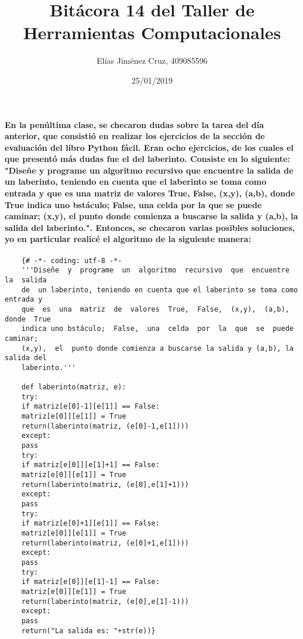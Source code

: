 \documentclass[letterpaper, 12pt, oneside]{article} %
\title{\Huge Bitácora 14 del Taller de Herramientas Computacionales}
\author{Elías Jiménez Cruz, 409085596}
\date{25/01/2019}
\begin{document}
	\maketitle
	\paragraph{En la penúltima clase, se checaron dudas sobre la tarea del día anterior, que consistió en realizar los ejercicios de la sección de evaluación del libro Python fácil. Eran ocho ejercicios, de los cuales el que presentó más dudas fue el del laberinto. Consiste en lo siguiente: "Diseñe  y  programe  un  algoritmo  recursivo  que  encuentre  la  salida de  un laberinto, teniendo en cuenta que el laberinto se toma como entrada y que  es  una  matriz  de  valores  True,  False,  (x,y),  (a,b),  donde  True indica uno bstáculo;  False,  una  celda  por  la  que  se  puede  caminar; (x,y),  el  punto donde comienza a buscarse la salida y (a,b), la salida del laberinto.". Entonces, se checaron varias posibles soluciones, yo en particular realicé el algoritmo de la siguiente manera:}
	\begin{verbatim}
	{# -*- coding: utf-8 -*-
	'''Diseñe  y  programe  un  algoritmo  recursivo  que  encuentre  la  salida
	de  un laberinto, teniendo en cuenta que el laberinto se toma como entrada y
	que  es  una  matriz  de  valores  True,  False,  (x,y),  (a,b),  donde  True
	indica uno bstáculo;  False,  una  celda  por  la  que  se  puede  caminar;
	(x,y),  el  punto donde comienza a buscarse la salida y (a,b), la salida del
	laberinto.'''
	
	def laberinto(matriz, e):
	try:
	if matriz[e[0]-1][e[1]] == False:
	matriz[e[0]][e[1]] = True
	return(laberinto(matriz, (e[0]-1,e[1])))
	except:
	pass
	try:
	if matriz[e[0]][e[1]+1] == False:
	matriz[e[0]][e[1]] = True
	return(laberinto(matriz, (e[0],e[1]+1)))
	except:
	pass
	try:
	if matriz[e[0]+1][e[1]] == False:
	matriz[e[0]][e[1]] = True
	return(laberinto(matriz, (e[0]+1,e[1])))
	except:
	pass
	try:
	if matriz[e[0]][e[1]-1] == False:
	matriz[e[0]][e[1]] = True
	return(laberinto(matriz, (e[0],e[1]-1)))
	except:
	pass
	return("La salida es: "+str(e))}
	\end{verbatim}
\end{document}
